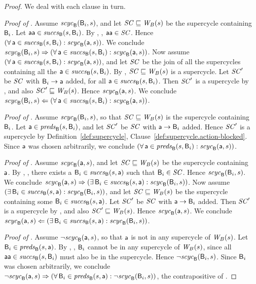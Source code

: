 \begin{proof}
We deal with each clause in turn.


\textit{Proof of }.
%
Assume $\scyc{\B}{s}{\B_i}$, and let $\SC \subg \wfg{B}{s}$ be the supercycle containing $\B_i$.  Let
$\actp \in \succs{\B}{s}{\B_i}$.  By , ,
$\actp \in \SC$.  Hence $(\fa \act \in \succs{\B}{s}{\B_i} : \scyc{\B}{s}{\act})$.
We conclude
$\scyc{\B}{s}{\B_i} \imp (\fa \act \in \succs{\B}{s}{\B_i} : \scyc{\B}{s}{\act})$.
%
Now assume $(\fa \act \in \succs{\B}{s}{\B_i} : \scyc{\B}{s}{\act})$, and let 
$\SC$ be the join of all the supercycles containing all the $\act \in \succs{\B}{s}{\B_i}$. 
By , $\SC \subg \wfg{B}{s}$ is a supercycle.
Let $\SC'$ be $\SC$ with $\B_i \ar \act$ added, for all 
$\act \in \succs{\B}{s}{\B_i}$.
Then $\SC'$ is a supercycle by 
, and also $\SC' \subg \wfg{B}{s}$. Hence $\scyc{\B}{s}{\act}$.
We conclude 
$\scyc{\B}{s}{\B_i} \folf (\fa \act \in \succs{\B}{s}{\B_i} : \scyc{\B}{s}{\act})$.




\textit{Proof of }.
%
Assume $\scyc{\B}{s}{\B_i}$, so that $\SC \subg \wfg{B}{s}$ is the supercycle containing $\B_i$.
Let  $\act \in \preds{\B}{s}{\B_i}$, and let $\SC'$ be $\SC$ with 
$\act \ar \B_i$ added. Hence $\SC'$ is a supercycle 
by Definition~\ref{def:supercycle},
  Clause~\ref{def:supercycle.action-blocked}.
Since $\act$ was chosen arbitrarily, we conclude 
$(\fa \act \in \preds{\B}{s}{\B_i} : \scyc{\B}{s}{\act})$.



\textit{Proof of }.
%
Assume $\scyc{\B}{s}{\act}$, and let $\SC \subg \wfg{B}{s}$ be the supercycle containing $\act$.  By
, , there exists a
$\B_i \in \succs{\B}{s}{\act}$ such that $\B_i \in \SC$.  Hence $\scyc{\B}{s}{\B_i}$.
We conclude
$\scyc{\B}{s}{\act} \imp (\ex \B_i \in \succs{\B}{s}{\act} : \scyc{\B}{s}{\B_i})$.
%
Now assume $(\ex \B_i \in \succs{\B}{s}{\act} : \scyc{\B}{s}{\B_i})$, and let 
$\SC \subg \wfg{B}{s}$ be the supercycle containing some $\B_i \in \succs{\B}{s}{\act}$. 
Let $\SC'$ be $\SC$ with $\act \ar \B_i$ added. Then $\SC'$ is a supercycle by 
, and also $\SC' \subg \wfg{B}{s}$. Hence $\scyc{\B}{s}{\act}$.
We conclude 
$\scyc{\B}{s}{\act} \folf (\ex \B_i \in \succs{\B}{s}{\act} : \scyc{\B}{s}{\B_i})$.


\textit{Proof of }.  
%
Assume $\neg \scyc{\B}{s}{\act}$, so that $\act$ is not in any supercycle of $\wfg{B}{s}$.
Let $\B_i \in \preds{\B}{s}{\act}$. 
By , , 
$\B_i$ cannot be in any supercycle of $\wfg{B}{s}$, since all $\actp \in \succs{\B}{s}{\B_i}$ must
also be in the supercycle. Hence $\neg \scyc{\B}{s}{\B_i}$.
Since $\B_i$ was chosen arbitrarily, we conclude
$\neg \scyc{\B}{s}{\act} \imp  (\fa \B_i \in \preds{\B}{s}{\act} : \neg \scyc{\B}{s}{\B_i})$, the
contrapositive of .  
\end{proof}



